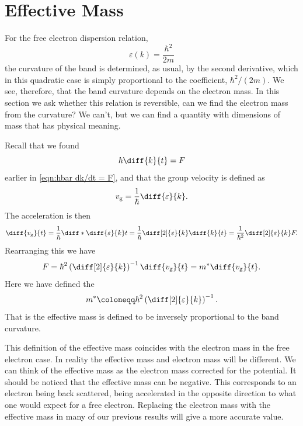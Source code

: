 \documentclass[fleqn]{NotesClass}
\begin{document}
    \section{Effective Mass}
    For the free electron dispersion relation,
    \begin{equation}
        \varepsilon(k) = \frac{\hbar^2}{2m}
    \end{equation}
    the curvature of the band is determined, as usual, by the second derivative, which in this quadratic case is simply proportional to the coefficient, \(\hbar^2/(2m)\).
    We see, therefore, that the band curvature depends on the electron mass.
    In this section we ask whether this relation is reversible, can we find the electron mass from the curvature?
    We can't, but we can find a quantity with dimensions of mass that has physical meaning.
    
    Recall that we found
    \begin{equation}
        \hbar\diff{k}{t} = F
    \end{equation}
    earlier in \cref{eqn:hbar dk/dt = F}, and that the group velocity is defined as
    \begin{equation}
        v_{\mathrm{g}} = \frac{1}{\hbar} \diff{\varepsilon}{k}.
    \end{equation}
    The acceleration is then
    \begin{equation}
        \diff{v_{\mathrm{g}}}{t} = \frac{1}{\hbar} \diff*{\diff{\varepsilon}{k}}{t} = \frac{1}{\hbar} \diff[2]{\varepsilon}{k}\diff{k}{t} = \frac{1}{\hbar^2}\diff[2]{\varepsilon}{k}F.
    \end{equation}
    Rearranging this we have
    \begin{equation}
        F = \hbar^2\left( \diff[2]{\varepsilon}{k} \right)^{-1} \diff{v_{\mathrm{g}}}{t} = m^*\diff{v_{\mathrm{g}}}{t}.
    \end{equation}
    Here we have defined the 
    \begin{equation}
        m^* \coloneqq \hbar^2\left( \diff[2]{\varepsilon}{k} \right)^{-1}.
    \end{equation}
    That is the effective mass is defined to be inversely proportional to the band curvature.
    
    This definition of the effective mass coincides with the electron mass in the free electron case.
    In reality the effective mass and electron mass will be different.
    We can think of the effective mass as the electron mass corrected for the potential.
    It should be noticed that the effective mass can be negative.
    This corresponds to an electron being back scattered, being accelerated in the opposite direction to what one would expect for a free electron.
    Replacing the electron mass with the effective mass in many of our previous results will give a more accurate value.
    
\end{document}
